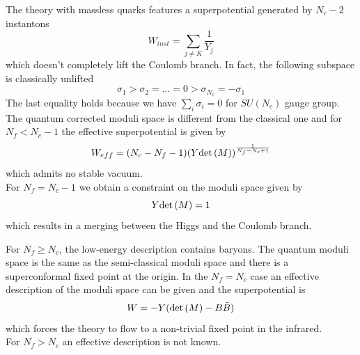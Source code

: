 The theory with massless quarks features a superpotential generated by $N_c - 2$ instantons 
\begin{equation}
W_{inst} = \sum_{j \neq K} \frac{1}{Y_j}
\label{eqn:AHW_superpotential}
\end{equation}
which doesn't completely lift the Coulomb branch.
In fact, the following subspace is classically unlifted
\begin{equation}
 \sigma_1 > \sigma_2 = \dots = 0 > \sigma_{N_c} = - \sigma_1
 \label{eqn:ahw_subspace_unlifted}
\end{equation}
The last equality holds because we have $\sum_i \sigma_i = 0$ for $SU(N_c)$ gauge group.
The quantum corrected moduli space is different from the classical one and for $N_f < N_c -1 $ the effective superpotential is given by
\begin{equation}
 W_{eff} = (N_c - N_f - 1) ( Y \mathrm{det } \,{(M)} ) ^{\frac{1}{N_f - N_c +1}}
\end{equation}
which admits no stable vacuum.\\
For $N_f = N_c - 1 $ we obtain a constraint on the moduli space given by 
\begin{equation}
Y \mathrm{det } \,( M) = 1
\label{eqn:suN-3d-nf-nc-1-vacuum}
\end{equation}
which results in a merging between the Higgs and the Coulomb branch.

For $N_f \geq N_c $, the low-energy description contains baryons.
The quantum moduli space is the same as the semi-classical moduli space and there is a superconformal fixed point at the origin.
In the $N_f = N_c$ case an effective description of the moduli space can be given and the superpotential is 
\begin{equation}
W = - Y ( \mathrm{det } \,{(M)} - B \tilde{B})
\label{eqn:3d_sun_nf__n_c_superpot}
\end{equation}
which forces the theory to flow to a non-trivial fixed point in the infrared.\\
For $N_f >N_c$ an effective description is not known.


